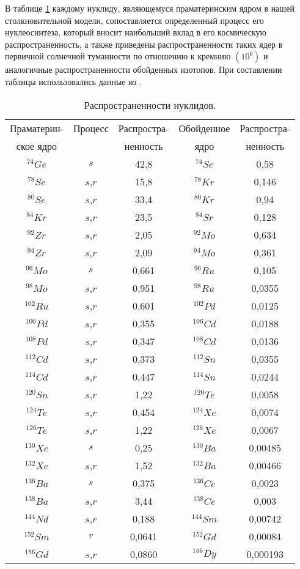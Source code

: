 В таблице \ref{Tels2} каждому нуклиду, являющемуся праматеринским ядром в нашей столкновительной модели, сопоставляется
определенный процесс его нуклеосинтеза, который вносит наибольший вклад в его космическую распространенность, а также
приведены распространенности таких ядер в первичной солнечной туманности по отношению к кремнию $(10^6)$ и аналогичные
распространенности обойденных  изотопов. При составлении таблицы использовались данные из \cite{iader}.
\noindent
\begin{table}
\caption{Распространенности нуклидов.}
\tabcolsep=5pt
\begin{tabular}{|c|c|c|c|c|}
\hline
 Праматерин-& Процесс & Распростра-&Обойденное&Распростра-\\
 ское ядро  &         & ненность&     ядро     &ненность\\
 \hline
  $^{74}Ge$ & $s$     & 42,8  & $^{74}Se$ & 0,58   \\
  $^{78}Se$ & $s$,$r$ & 15,8  & $^{78}Kr$ & 0,146   \\
  $^{80}Se$ & $s$,$r$ & 33,4  & $^{80}Kr$ & 0,94   \\
  $^{84}Kr$ & $s$,$r$ & 23,5  & $^{84}Sr$ & 0,128   \\
  $^{92}Zr$ & $s$,$r$ & 2,05  & $^{92}Mo$ & 0,634   \\
  $^{94}Zr$ & $s$,$r$ & 2,09  & $^{94}Mo$ & 0,361   \\
  $^{96}Mo$ & $s$     & 0,661  & $^{96}Ru$ & 0,105   \\
  $^{98}Mo$ & $s$,$r$ & 0,951  & $^{98}Ru$ & 0,0355   \\
  $^{102}Ru$ & $s$,$r$ & 0,601  & $^{102}Pd$ & 0,0125   \\
  $^{106}Pd$ & $s$,$r$ & 0,355  & $^{106}Cd$ & 0,0188   \\
  $^{108}Pd$ & $s$,$r$ & 0,347  & $^{108}Cd$ & 0,0136   \\
  $^{112}Cd$ & $s$,$r$ & 0,373  & $^{112}Sn$ & 0,0355   \\
  $^{114}Cd$ & $s$,$r$ & 0,447  & $^{114}Sn$ & 0,0244   \\
  $^{120}Sn$ & $s$,$r$ & 1,22  & $^{120}Te$ &  0,0058  \\
  $^{124}Te$ & $s$,$r$ & 0,454  & $^{124}Xe$ & 0,0074   \\
  $^{126}Te$ & $s$,$r$ & 1,22  & $^{126}Xe$ &  0,0067  \\
  $^{130}Xe$ & $s$     & 0,25  & $^{130}Ba$ &  0,00485  \\
  $^{132}Xe$ & $s$,$r$ & 1,52  & $^{132}Ba$ &  0,00466  \\
  $^{136}Ba$ & $s$     & 0,375  & $^{136}Ce$ & 0,0023   \\
  $^{138}Ba$ & $s$,$r$ & 3,44  & $^{138}Ce$ &  0,003  \\
  $^{144}Nd$ & $s$,$r$ & 0,188  & $^{144}Sm$ & 0,00742   \\
  $^{152}Sm$ & $r$     & 0,0641  & $^{152}Gd$ & 0,00084   \\
  $^{156}Gd$ & $s$,$r$ & 0,0860  & $^{156}Dy$ & 0,000193   \\
  \hline
\end{tabular}
\label{Tels2}
\end{table}


